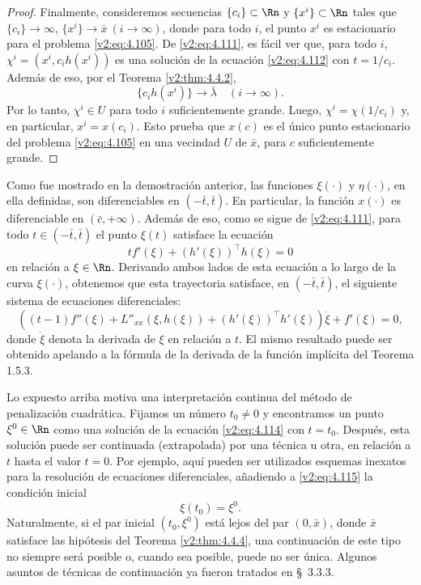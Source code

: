 \begin{proof}
    Finalmente, consideremos secuencias $\{c_i\} \subset \Rn$ y $\{x^i\} \subset \Rn$ tales que $\{c_i\} \to \infty$, $\{x^i\} \to \bar{x} \ (i \to \infty)$, donde para todo $i$, el punto $x^i$ es estacionario para el problema \eqref{v2:eq:4.105}. De \eqref{v2:eq:4.111}, es fácil ver que, para todo $i$, $\chi^i = (x^i, c_i h(x^i))$ es una solución de la ecuación \eqref{v2:eq:4.112} con $t = 1/c_i$. Además de eso, por el Teorema \ref{v2:thm:4.4.2},
    \[
        \{c_i h(x^i)\} \to \bar{\lambda} \quad (i \to \infty).
    \]
    Por lo tanto, $\chi^i \in U$ para todo $i$ suficientemente grande. Luego, $\chi^i = \chi(1/c_i)$ y, en particular, $x^i = x(c_i)$. Esto prueba que $x(c)$ es el único punto estacionario del problema \eqref{v2:eq:4.105} en una vecindad $U$ de $\bar{x}$, para $c$ suficientemente grande.
\end{proof}

Como fue mostrado en la demostración anterior, las funciones $\xi(\cdot)$ y $\eta(\cdot)$, en ella definidas, son diferenciables en $(-\bar{t}, \bar{t})$. En particular, la función $x(\cdot)$ es diferenciable en $(\bar{c}, +\infty)$. Además de eso, como se sigue de \eqref{v2:eq:4.111}, para todo $t \in (-\bar{t}, \bar{t})$ el punto $\xi(t)$ satisface la ecuación
\begin{equation}
    tf'(\xi) + (h'(\xi))^\top h(\xi) = 0
    \label{v2:eq:4.114}
\end{equation}
en relación a $\xi \in \Rn$. Derivando ambos lados de esta ecuación a lo largo de la curva $\xi(\cdot)$, obtenemos que esta trayectoria satisface, en $(-\bar{t}, \bar{t})$, el siguiente sistema de ecuaciones diferenciales:
\begin{equation}
    ((t - 1)f''(\xi) + L''_{xx}(\xi, h(\xi)) + (h'(\xi))^\top h'(\xi))\dot{\xi} + f'(\xi) = 0,
    \label{v2:eq:4.115}
\end{equation}
donde $\dot{\xi}$ denota la derivada de $\xi$ en relación a $t$. El mismo resultado puede ser obtenido apelando a la fórmula de la derivada de la función implícita del Teorema 1.5.3.

Lo expuesto arriba motiva una interpretación continua del método de penalización cuadrática. Fijamos un número $t_0 \neq 0$ y encontramos un punto $\xi^0 \in \Rn$ como una solución de la ecuación \eqref{v2:eq:4.114} con $t = t_0$. Después, esta solución puede ser continuada (extrapolada) por una técnica u otra, en relación a $t$ hasta el valor $t = 0$. Por ejemplo, aquí pueden ser utilizados esquemas inexatos para la resolución de ecuaciones diferenciales, añadiendo a \eqref{v2:eq:4.115} la condición inicial
\[
    \xi(t_0) = \xi^0.
\]
Naturalmente, si el par inicial $(t_0, \xi^0)$ está lejos del par $(0, \bar{x})$, donde $\bar{x}$ satisface las hipótesis del Teorema \ref{v2:thm:4.4.4}, una continuación de este tipo no siempre será posible o, cuando sea posible, puede no ser única. Algunos asuntos de técnicas de continuación ya fueron tratados en \S~3.3.3.

